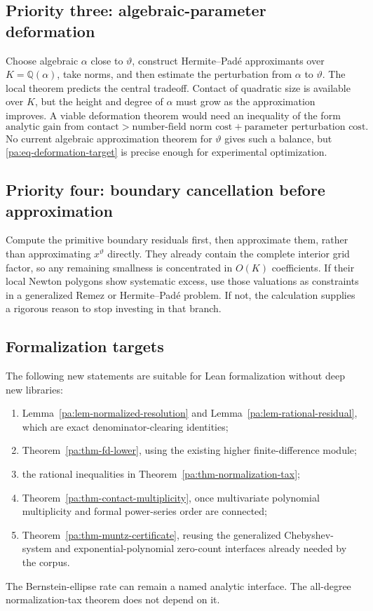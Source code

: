\documentclass[11pt,oneside]{article}
\theoremstyle{definition}
\theoremstyle{remark}
\newcommand{\Q}{\mathbb Q}
\newcommand{\thetaq}{\vartheta}
\begin{document}
\subsection{Priority three: algebraic-parameter deformation}

Choose algebraic \(\alpha\) close to \(\thetaq\), construct Hermite--Pad\'e approximants over
\(K=\Q(\alpha)\), take norms, and then estimate the perturbation from \(\alpha\) to
\(\thetaq\).  The local theorem predicts the central tradeoff.  Contact of quadratic size is
available over \(K\), but the height and degree of \(\alpha\) must grow as the approximation
improves.  A viable deformation theorem would need an inequality of the form
\begin{equation}
 \text{analytic gain from contact}
 >
 \text{number-field norm cost}
 +
 \text{parameter perturbation cost}.
 \label{pa:eq-deformation-target}
\end{equation}
No current algebraic approximation theorem for \(\thetaq\) gives such a balance, but
\eqref{pa:eq-deformation-target} is precise enough for experimental optimization.

\subsection{Priority four: boundary cancellation before approximation}

Compute the primitive boundary residuals first, then approximate them, rather than approximating
\(x^{\thetaq}\) directly.  They already contain the complete interior grid factor, so any
remaining smallness is concentrated in \(O(K)\) coefficients.  If their local Newton polygons
show systematic excess, use those valuations as constraints in a generalized Remez or
Hermite--Pad\'e problem.  If not, the calculation supplies a rigorous reason to stop investing
in that branch.

\subsection{Formalization targets}

The following new statements are suitable for Lean formalization without deep new libraries:
\begin{enumerate}
\item Lemma~\ref{pa:lem-normalized-resolution} and
Lemma~\ref{pa:lem-rational-residual}, which are exact denominator-clearing identities;
\item Theorem~\ref{pa:thm-fd-lower}, using the existing higher finite-difference module;
\item the rational inequalities in Theorem~\ref{pa:thm-normalization-tax};
\item Theorem~\ref{pa:thm-contact-multiplicity}, once multivariate polynomial multiplicity and
formal power-series order are connected;
\item Theorem~\ref{pa:thm-muntz-certificate}, reusing the generalized Chebyshev-system and
exponential-polynomial zero-count interfaces already needed by the corpus.
\end{enumerate}
The Bernstein-ellipse rate can remain a named analytic interface.  The all-degree
normalization-tax theorem does not depend on it.
\end{document}

